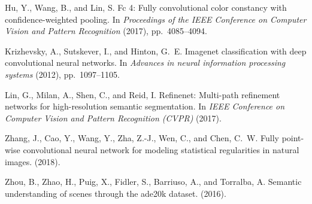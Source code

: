 \documentclass[sigplan]{acmart}
\begin{document}
\begin{thebibliography}{10}
{\sc Hu, Y., Wang, B., and Lin, S.}
\newblock Fc 4: Fully convolutional color constancy with confidence-weighted
  pooling.
\newblock In {\em Proceedings of the IEEE Conference on Computer Vision and
  Pattern Recognition\/} (2017), pp.~4085--4094.

{\sc Krizhevsky, A., Sutskever, I., and Hinton, G.~E.}
\newblock Imagenet classification with deep convolutional neural networks.
\newblock In {\em Advances in neural information processing systems\/} (2012),
  pp.~1097--1105.

{\sc Lin, G., Milan, A., Shen, C., and Reid, I.}
\newblock Refinenet: Multi-path refinement networks for high-resolution
  semantic segmentation.
\newblock In {\em IEEE Conference on Computer Vision and Pattern Recognition
  (CVPR)\/} (2017).

{\sc Zhang, J., Cao, Y., Wang, Y., Zha, Z.-J., Wen, C., and Chen, C.~W.}
\newblock Fully point-wise convolutional neural network for modeling
  statistical regularities in natural images.
 (2018).

{\sc Zhou, B., Zhao, H., Puig, X., Fidler, S., Barriuso, A., and Torralba, A.}
\newblock Semantic understanding of scenes through the ade20k dataset.
 (2016).

\end{thebibliography}
\end{document}
